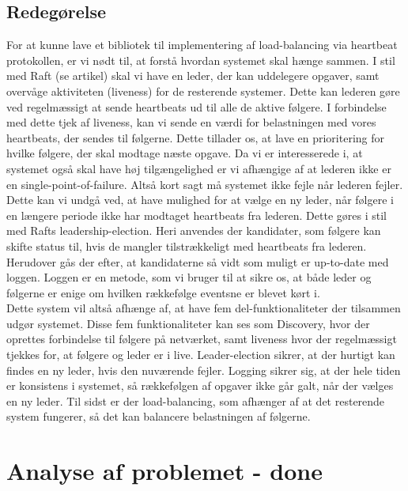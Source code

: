 \documentclass[a4paper,12pt]{article}
\begin{document}
\subsection*{Redegørelse}
For at kunne lave et bibliotek til implementering af load-balancing via heartbeat protokollen, er vi nødt til, at forstå hvordan systemet skal hænge sammen.
I stil med Raft (se artikel) skal vi have en leder, der kan uddelegere opgaver, samt overvåge aktiviteten (liveness) for de resterende systemer. Dette kan lederen gøre ved regelmæssigt at sende heartbeats ud til alle de aktive følgere. I forbindelse med dette tjek af liveness, kan vi sende en værdi for belastningen med vores heartbeats, der sendes til følgerne. Dette tillader os, at lave en prioritering for hvilke følgere, der skal modtage næste opgave. 
Da vi er interesserede i, at systemet også skal have høj tilgængelighed er vi afhængige af at lederen ikke er en single-point-of-failure. Altså kort sagt må systemet ikke fejle når lederen fejler.
\\[5px]
Dette kan vi undgå ved, at have mulighed for at vælge en ny leder, når følgere i en længere periode ikke har modtaget heartbeats fra lederen. Dette gøres i stil med Rafts leadership-election. Heri anvendes der kandidater, som følgere kan skifte status til, hvis de mangler tilstrækkeligt med heartbeats fra lederen. Herudover gås der efter, at kandidaterne så vidt som muligt er up-to-date med loggen. Loggen er en metode, som vi bruger til at sikre os, at både leder og følgerne er enige om hvilken rækkefølge eventsne er blevet kørt i.
\\[5px]
Dette system vil altså afhænge af, at have fem del-funktionaliteter der tilsammen udgør systemet. Disse fem funktionaliteter kan ses som Discovery, hvor der oprettes forbindelse til følgere på netværket, samt liveness hvor der regelmæssigt tjekkes for, at følgere og leder er i live. Leader-election sikrer, at der hurtigt kan findes en ny leder, hvis den nuværende fejler. Logging sikrer sig, at der hele tiden er konsistens i systemet, så rækkefølgen af opgaver ikke går galt, når der vælges en ny leder. Til sidst er der load-balancing, som afhænger af at det resterende system fungerer, så det kan balancere belastningen af følgerne.

\section*{Analyse af problemet - done}
\end{document}
